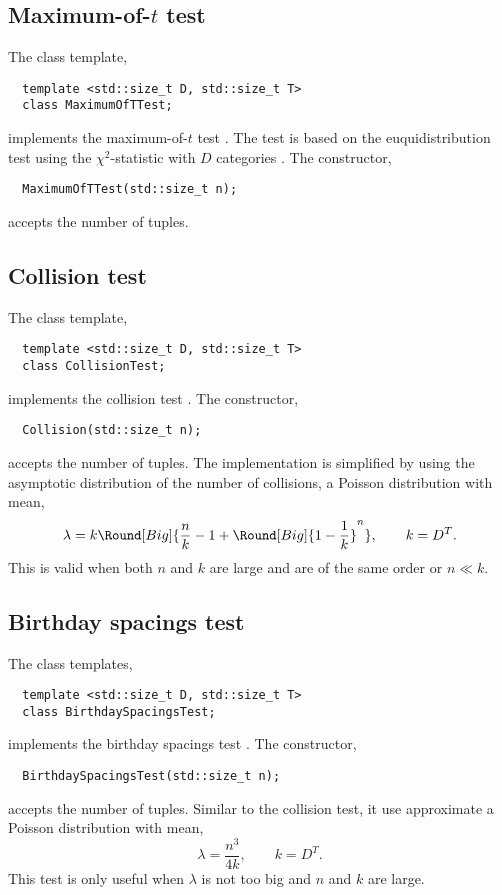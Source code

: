 \subsection{Maximum-of-$t$ test}
\label{Maximum-of-t test}

The class template,
\begin{Verbatim}
  template <std::size_t D, std::size_t T>
  class MaximumOfTTest;
\end{Verbatim}
implements the maximum-of-$t$ test \cite[pp.~70]{Knuth:1997us}. The test is
based on the euquidistribution test using the $\chi^2$-statistic with $D$
categories \cite[pp.~61]{Knuth:1997us}. The constructor,
\begin{Verbatim}
  MaximumOfTTest(std::size_t n);
\end{Verbatim}
accepts the number of tuples.

\subsection{Collision test}
\label{Collision test}

The class template,
\begin{Verbatim}
  template <std::size_t D, std::size_t T>
  class CollisionTest;
\end{Verbatim}
implements the collision test \cite[pp.~70]{Knuth:1997us}. The constructor,
\begin{Verbatim}
  Collision(std::size_t n);
\end{Verbatim}
accepts the number of tuples. The implementation is simplified by using the
asymptotic distribution of the number of collisions, a Poisson distribution
with mean,
\begin{equation*}
  \lambda = k\Round[Big]{
    \frac{n}{k} - 1 + \Round[Big]{1 - \frac{1}{k}}^n},\qquad k = D^T.
\end{equation*}
This is valid when both $n$ and $k$ are large and are of the same order or
$n \ll k$.

\subsection{Birthday spacings test}
\label{sub:Birthday spacings test}

The class templates,
\begin{Verbatim}
  template <std::size_t D, std::size_t T>
  class BirthdaySpacingsTest;
\end{Verbatim}
implements the birthday spacings test \cite[pp.~71]{Knuth:1997us}. The
constructor,
\begin{Verbatim}
  BirthdaySpacingsTest(std::size_t n);
\end{Verbatim}
accepts the number of tuples. Similar to the collision test, it use approximate
a Poisson distribution with mean,
\begin{equation*}
  \lambda = \frac{n^3}{4k},\qquad k = D^T.
\end{equation*}
This test is only useful when $\lambda$ is not too big and $n$ and $k$ are
large.
